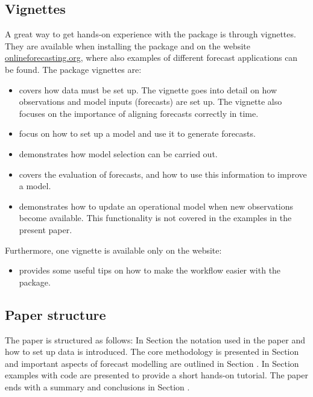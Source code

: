 \subsection{Vignettes}\label{subsec:vignettes}
A great way to get hands-on experience with the package is through vignettes. They are
available when installing the package and on the website
\href{https://onlineforecasting.org}{onlineforecasting.org}, where also examples
of different forecast applications can be found. The package vignettes are:
\begin{itemize}
\item {} covers how data must be set up. The
  vignette goes into detail on how observations and model inputs
  (forecasts) are set up. The vignette also focuses on the importance of
  aligning forecasts correctly in time.
\item {} focus on how to set up a model and use it
  to generate forecasts.
\item {} demonstrates how model selection
  can be carried out.
\item {} covers the evaluation of forecasts, and how to
  use this information to improve a model.
\item {} demonstrates how to update an operational model when new observations become available. This functionality is not
  covered in the \Rprog examples in the present paper.
\end{itemize}

Furthermore, one vignette is available only on the website:
\begin{itemize}
\item {} provides some useful tips on how to
  make the workflow easier with the package.
\end{itemize}


\subsection{Paper structure}

The paper is structured as follows: In Section
 the notation used in the paper and how to set up
data is introduced. The core methodology is presented in Section
 and important aspects of forecast modelling are
outlined in Section . In Section
 examples with \Rprog code are presented to provide a
short hands-on tutorial. The paper ends with a summary and conclusions in Section
.

